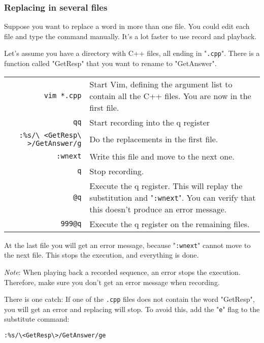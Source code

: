 \subsubsection{Replacing in several files}
Suppose you want to replace a word in more than one file.
You could edit each file and type the command manually.
It's a lot faster to use record and playback.

Let's assume you have a directory with C++ files, all ending in "\texttt{.cpp}".
There is a function called "GetResp" that you want to rename to "GetAnswer".

\begin{center} \begin{tabularx}{\textwidth}{r p{11cm}} %
				\texttt{vim *.cpp} & Start Vim, defining the argument list to contain all the C++ files.
				You are now in the first file. \\
				\texttt{qq} & Start recording into the q register \\
				\texttt{:\%s/\textbackslash{} <GetResp\textbackslash{} >/GetAnswer/g} & Do the replacements in the first file. \\
				\texttt{:wnext} & Write this file and move to the next one. \\
				\texttt{q} & Stop recording. \\
				\texttt{@q} & Execute the q register.
				This will replay the substitution and "\texttt{:wnext}".
				You can verify that this doesn't produce an error message. \\
				\texttt{999@q} & Execute the q register on the remaining files.  \\
\end{tabularx} \end{center}

At the last file you will get an error message, because "\texttt{:wnext}" cannot move to the next file.
This stops the execution, and everything is done.

\emph{Note}: When playing back a recorded sequence, an error stops the execution.
Therefore, make sure you don't get an error message when recording.

There is one catch: If one of the \texttt{.cpp} files does not contain the word "GetResp", you will get an error and replacing will stop.
To avoid this, add the "\texttt{e}" flag to the substitute command:

\begin{Verbatim}[samepage=true]
 :%s/\<GetResp\>/GetAnswer/ge
\end{Verbatim}

